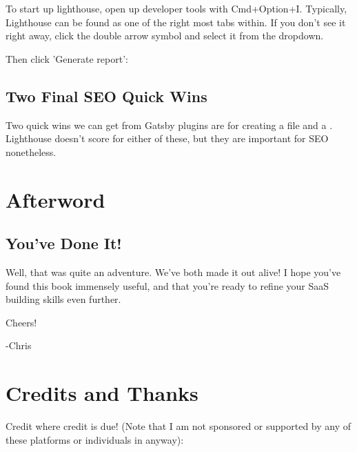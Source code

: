 \documentclass[a4paper,headinclude=on,footinclude=on,12pt,oneside]{scrbook}
\begin{document}
To start up lighthouse, open up developer tools with Cmd+Option+I. Typically, Lighthouse can be found as one of the right most tabs within. If you don't see it right away, click the double arrow symbol and select it from the dropdown.

Then click 'Generate report':


\section{Two Final SEO Quick Wins}

Two quick wins we can get from Gatsby plugins are for creating a  file and a . Lighthouse doesn't score for either of these, but they are important for SEO nonetheless.

\chapter*{Afterword}

\section*{You've Done It!}

Well, that was quite an adventure. We've both made it out alive! I hope you've found this book immensely useful, and that you're ready to refine your SaaS building skills even further.

Cheers! \beers

-Chris

\chapter*{Credits and Thanks}

Credit where credit is due! (Note that I am not sponsored or supported by any of these platforms or individuals in anyway):
\end{document}
